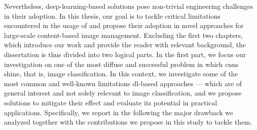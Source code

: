 Nevertheless, deep-learning-based solutions pose non-trivial engineering challenges in their adoption.
In this thesis, our goal is to tackle critical limitations encountered in the usage of  and propose their adoption in novel approaches for large-scale content-based image management.
Excluding the first two chapters, which introduce our work and provide the reader with relevant background, the dissertation is thus divided into two logical parts.
In the first part, we focus our investigation on one of the most diffuse and successful problem in which \glspl{cnn} shine, that is, image classification.
In this context, we investigate some of the most common and well-known limitations \gls{dl}-based approaches --- which are of general interest and not solely relevant to image classification, and we propose solutions to mitigate their effect and evaluate its potential in practical applications.
Specifically, we report in the following the major drawback we analyzed together with the contributions we propose in this study to tackle them.

